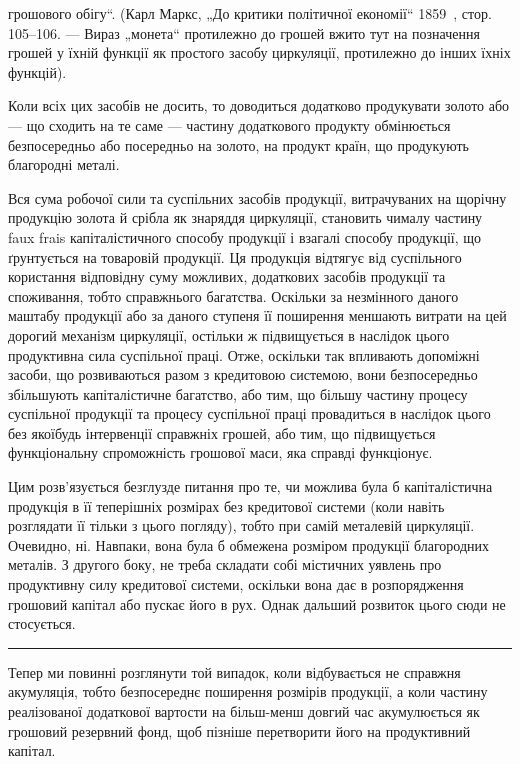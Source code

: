 \parcont{}  %
грошового обігу“. (Карл Маркс, „До критики політичної економії“
1859~, стор. 105--106. — Вираз „монета“ протилежно до грошей вжито
тут на позначення грошей у їхній функції як простого засобу циркуляції,
протилежно до інших їхніх функцій).

Коли всіх цих засобів не досить, то доводиться додатково продукувати
золото або — що сходить на те саме — частину додаткового продукту
обмінюється безпосередньо або посередньо на золото, на продукт країн,
що продукують благородні металі.

Вся сума робочої сили та суспільних засобів продукції, витрачуваних
на щорічну продукцію золота й срібла як знаряддя циркуляції, становить
чималу частину faux frais капіталістичного способу продукції і взагалі
способу продукції, що ґрунтується на товаровій продукції. Ця продукція
відтягує від суспільного користання відповідну суму можливих,
додаткових засобів продукції та споживання, тобто справжнього багатства.
Оскільки за незмінного даного маштабу продукції або за даного ступеня
її поширення меншають витрати на цей дорогий механізм циркуляції,
остільки ж підвищується в наслідок цього продуктивна сила суспільної
праці. Отже, оскільки так впливають допоміжні засоби, що розвиваються
разом з кредитовою системою, вони безпосередньо збільшують капіталістичне
багатство, або тим, що більшу частину процесу суспільної продукції
та процесу суспільної праці провадиться в наслідок цього без
якоїбудь інтервенції справжніх грошей, або тим, що підвищується
функціональну спроможність грошової маси, яка справді функціонує.

Цим розв’язується безглузде питання про те, чи можлива була б
капіталістична продукція в її теперішніх розмірах без кредитової системи
(коли навіть розглядати її тільки з цього погляду), тобто при самій
металевій циркуляції. Очевидно, ні. Навпаки, вона була б обмежена розміром
продукції благородних металів. З другого боку, не треба складати собі
містичних уявлень про продуктивну силу кредитової системи, оскільки
вона дає в розпорядження грошовий капітал або пускає його в рух.
Однак дальший розвиток цього сюди не стосується.
\pfbreak
Тепер ми повинні розглянути той випадок, коли відбувається не
справжня акумуляція, тобто безпосереднє поширення розмірів продукції,
а коли частину реалізованої додаткової вартости на більш-менш довгий
час акумулюється як грошовий резервний фонд, щоб пізніше перетворити
його на продуктивний капітал.

